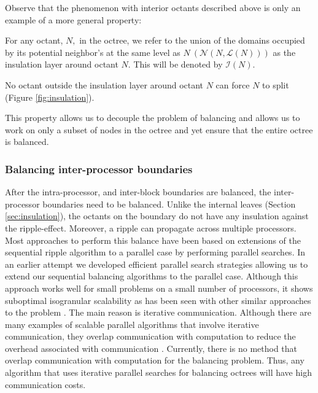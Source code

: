 Observe that the phenomenon with interior octants described above is
only an example of a more general property:

\begin{define}
For any octant, $N,$ in the octree, we refer to the union of the
domains occupied by its potential neighbor's at the same level as $N
~(\mathcal{N}(N,\mathcal{L}(N)))$ as the insulation layer around
octant $N$. This will be denoted by $\mathcal{I}(N)$.
\end{define}

\begin{prop}
 No octant outside the insulation layer around octant $N$ can force
 $N$ to split (Figure \ref{fig:insulation}).
 \label{prop:insulation}
\end{prop}
 
This property allows us to decouple the problem of balancing and
allows us to work on only a subset of nodes in the octree and yet
ensure that the entire octree is balanced.

\subsubsection{Balancing inter-processor boundaries}
\label{sec:parBal}
After the intra-processor, and inter-block boundaries are balanced, the
inter-processor boundaries need to be balanced. Unlike the internal
leaves (Section \ref{sec:insulation}), the octants on the boundary do
not have any insulation against the ripple-effect. Moreover, a ripple
can propagate across multiple processors. Most approaches to perform
this balance have been based on extensions of the sequential ripple
algorithm to a parallel case by performing parallel searches. In an
earlier attempt we developed efficient parallel search strategies
allowing us to extend our sequential balancing algorithms to the
parallel case. Although this approach works well for small problems on
a small number of processors, it shows suboptimal isogranular
scalability as has been seen with other similar approaches to the
problem \cite{tu05}. The main reason is iterative
communication. Although there are many examples of scalable parallel
algorithms that involve iterative communication, they overlap
communication with computation to reduce the overhead associated with
communication \cite{ karypis03, overlapComm97}. Currently, there is no
method that overlap communication with computation for the balancing
problem. Thus, any algorithm that uses iterative parallel searches for
balancing octrees will have high communication costs.

